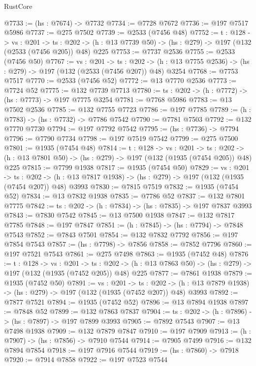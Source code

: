 \begin{lexlean}{RustCore}
\begin{coremodule}
@7733 := (hs : @7674) -> @7732
@7734 := @7728 @7672
@7736 := @197 @7517 @5986
@7737 := @275 @7502
@7739 := @2533 (@7456 @48)
@7752 := {t : @128} ->
  {vs : @201} ->
  {ts : @202} -> (h : @13 @7739 @50) -> (hs : @279) -> @197 (@132 (@2533 (@7456 @205)) @48) @225
@7753 := @7737 @2536
@7755 := @2533 (@7456 @50)
@7767 := {vs : @201} ->
  {ts : @202} -> (h : @13 @7755 @2536) -> (hs : @279) -> @197 (@132 (@2533 (@7456 @207)) @48) @3254
@7768 := @7753 @7517
@7770 := @2533 (@7456 @52)
@7772 := @13 @7770 @2536
@7773 := @7724 @52
@7775 := @132 @7739 @7713
@7780 := {ts : @202} -> (h : @7772) -> (hs : @7773) -> @197 @7775 @3254
@7781 := @7768 @5986
@7783 := @13 @7502 @2536
@7785 := @132 @7755 @7723
@7786 := @197 @7785
@7789 := (h : @7783) -> (hs : @7732) -> @7786 @7542
@7790 := @7781 @7503
@7792 := @132 @7770 @7730
@7794 := @197 @7792 @7542
@7795 := (hs : @7736) -> @7794
@7796 := @7790 @7734
@7798 := @197 @7519 @7542
@7799 := @275 @7500
@7801 := @1935 (@7454 @48)
@7814 := {t : @128} ->
  {vs : @201} ->
  {ts : @202} -> (h : @13 @7801 @50) -> (hs : @279) -> @197 (@132 (@1935 (@7454 @205)) @48) @225
@7815 := @7799 @1938
@7817 := @1935 (@7454 @50)
@7829 := {vs : @201} ->
  {ts : @202} -> (h : @13 @7817 @1938) -> (hs : @279) -> @197 (@132 (@1935 (@7454 @207)) @48) @3993
@7830 := @7815 @7519
@7832 := @1935 (@7454 @52)
@7834 := @13 @7832 @1938
@7835 := @7786 @52
@7837 := @132 @7801 @7775
@7842 := {ts : @202} -> (h : @7834) -> (hs : @7835) -> @197 @7837 @3993
@7843 := @7830 @7542
@7845 := @13 @7500 @1938
@7847 := @132 @7817 @7785
@7848 := @197 @7847
@7851 := (h : @7845) -> (hs : @7794) -> @7848 @7543
@7852 := @7843 @7501
@7854 := @132 @7832 @7792
@7856 := @197 @7854 @7543
@7857 := (hs : @7798) -> @7856
@7858 := @7852 @7796
@7860 := @197 @7521 @7543
@7861 := @275 @7498
@7863 := @1935 (@7452 @48)
@7876 := {t : @128} ->
  {vs : @201} ->
  {ts : @202} -> (h : @13 @7863 @50) -> (hs : @279) -> @197 (@132 (@1935 (@7452 @205)) @48) @225
@7877 := @7861 @1938
@7879 := @1935 (@7452 @50)
@7891 := {vs : @201} ->
  {ts : @202} -> (h : @13 @7879 @1938) -> (hs : @279) -> @197 (@132 (@1935 (@7452 @207)) @48) @3993
@7892 := @7877 @7521
@7894 := @1935 (@7452 @52)
@7896 := @13 @7894 @1938
@7897 := @7848 @52
@7899 := @132 @7863 @7837
@7904 := {ts : @202} -> (h : @7896) -> (hs : @7897) -> @197 @7899 @3993
@7905 := @7892 @7543
@7907 := @13 @7498 @1938
@7909 := @132 @7879 @7847
@7910 := @197 @7909
@7913 := (h : @7907) -> (hs : @7856) -> @7910 @7544
@7914 := @7905 @7499
@7916 := @132 @7894 @7854
@7918 := @197 @7916 @7544
@7919 := (hs : @7860) -> @7918
@7920 := @7914 @7858
@7922 := @197 @7523 @7544

\end{coremodule}
\end{lexlean}
